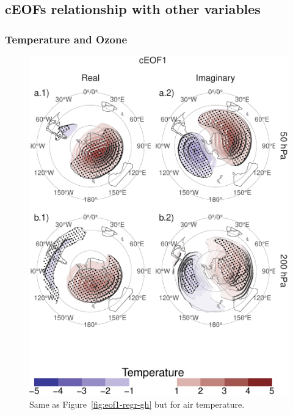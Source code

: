 \documentclass[smallextended]{svjour3}       %
\begin{document}
\hypertarget{ceofs-relationship-with-other-variables}{%
\subsection{cEOFs relationship with other variables}\label{ceofs-relationship-with-other-variables}}

\hypertarget{temperature-and-ozone}{%
\subsubsection{Temperature and Ozone}\label{temperature-and-ozone}}



\begin{figure}
\centering
\includegraphics{../figures/eof1-regr-t-1.pdf}
\caption{\label{fig:eof1-regr-t}Same as Figure~\ref{fig:eof1-regr-gh} but for air temperature.}
\end{figure}
\end{document}
